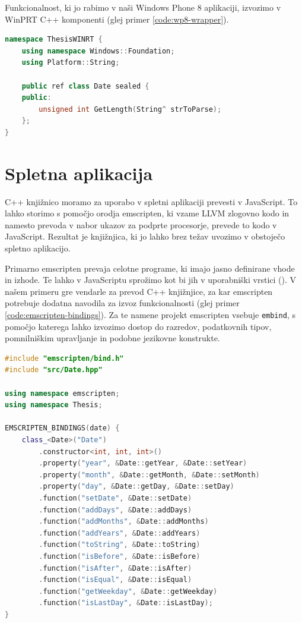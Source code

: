 Funkcionalnost, ki jo rabimo v naši Windows Phone 8 aplikaciji, izvozimo v WinPRT C++ komponenti (glej primer \ref{code:wp8-wrapper}).

\lstset{language=[Sharp]C, breaklines}
\begin{lstlisting}[caption={C++ koda za izvoz funckionalnosti knjižnice v JavaScript razreda \texttt{Date}.}, label=code:wp8-wrapper, language=c++]
namespace ThesisWINRT {
    using namespace Windows::Foundation;
    using Platform::String;

    public ref class Date sealed {
    public:
        unsigned int GetLength(String^ strToParse);
    };
}
\end{lstlisting}

\section{Spletna aplikacija}

C++ knjižnico moramo za uporabo v spletni aplikaciji prevesti v JavaScript. To lahko storimo s pomočjo orodja emscripten, ki vzame LLVM zlogovno kodo in namesto prevoda v nabor ukazov za podprte procesorje, prevede to kodo v JavaScript. Rezultat je knjižnjica, ki jo lahko brez težav uvozimo v obstoječo spletno aplikacijo.

Primarno emscripten prevaja celotne programe, ki imajo jasno definirane vhode in izhode. Te lahko v JavaScriptu sprožimo kot bi jih v uporabniški vrstici (). V našem primeru gre vendarle za prevod C++ knjižnjice, za kar emscripten potrebuje dodatna navodila za izvoz funkcionalnosti (glej primer \ref{code:emscripten-bindings}). Za te namene projekt emscripten vsebuje \texttt{embind}\cite{emscripten-embind}, s pomočjo katerega lahko izvozimo dostop do razredov, podatkovnih tipov, pomnilniškim upravljanje in podobne jezikovne konstrukte.

\begin{lstlisting}[caption={C++ koda za izvoz funckionalnosti knjižnice v JavaScript razreda \texttt{Date}.}, label=code:emscripten-bindings, language=c++]
#include "emscripten/bind.h"
#include "src/Date.hpp"

using namespace emscripten;
using namespace Thesis;

EMSCRIPTEN_BINDINGS(date) {
    class_<Date>("Date")
        .constructor<int, int, int>()
        .property("year", &Date::getYear, &Date::setYear)
        .property("month", &Date::getMonth, &Date::setMonth)
        .property("day", &Date::getDay, &Date::setDay)
        .function("setDate", &Date::setDate)
        .function("addDays", &Date::addDays)
        .function("addMonths", &Date::addMonths)
        .function("addYears", &Date::addYears)
        .function("toString", &Date::toString)
        .function("isBefore", &Date::isBefore)
        .function("isAfter", &Date::isAfter)
        .function("isEqual", &Date::isEqual)
        .function("getWeekday", &Date::getWeekday)
        .function("isLastDay", &Date::isLastDay);
}
\end{lstlisting}

